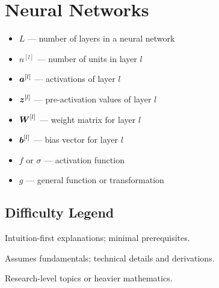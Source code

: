 \section*{Neural Networks}

\begin{itemize}[leftmargin=2em]
    \item $L$ --- number of layers in a neural network
    \item $n^{[l]}$ --- number of units in layer $l$
    \item $\boldsymbol{a}^{[l]}$ --- activations of layer $l$
    \item $\boldsymbol{z}^{[l]}$ --- pre-activation values of layer $l$
    \item $\boldsymbol{W}^{[l]}$ --- weight matrix for layer $l$
    \item $\boldsymbol{b}^{[l]}$ --- bias vector for layer $l$
    \item $f$ or $\sigma$ --- activation function
    \item $g$ --- general function or transformation
\end{itemize}

\subsection*{Difficulty Legend}

\begin{description}[leftmargin=2.2em,labelsep=0.6em]
  \item[\difficultyBeginner\ Beginner] Intuition-first explanations; minimal prerequisites.
  \item[\difficultyIntermediate\ Intermediate] Assumes fundamentals; technical details and derivations.
  \item[\difficultyAdvanced\ Advanced] Research-level topics or heavier mathematics.
\end{description}
